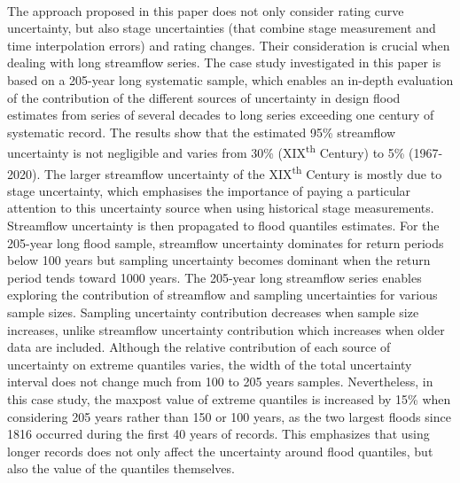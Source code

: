     \paragraph{}
    The approach proposed in this paper does not only consider rating curve uncertainty, but also stage uncertainties (that combine stage measurement and time interpolation errors) and rating changes. Their consideration is crucial when dealing with long streamflow series. The case study investigated in this paper is based on a 205-year long systematic sample, which enables an in-depth evaluation of the contribution of the different sources of uncertainty in design flood estimates from series of several decades to long series exceeding one century of systematic record. The results show that the estimated 95\% streamflow uncertainty is not negligible and varies from 30\% (XIX\textsuperscript{th} Century) to 5\% (1967-2020). The larger streamflow uncertainty of the XIX\textsuperscript{th} Century is mostly due to stage uncertainty, which emphasises the importance of paying a particular attention to this uncertainty source when using historical stage measurements. Streamflow uncertainty is then propagated to flood quantiles estimates. For the 205-year long flood sample, streamflow uncertainty dominates for return periods below 100 years but sampling uncertainty becomes dominant when the return period tends toward 1000 years. The 205-year long streamflow series enables exploring the contribution of streamflow and sampling uncertainties for various sample sizes. Sampling uncertainty contribution decreases when sample size increases, unlike streamflow uncertainty contribution which increases when older data are included. Although the relative contribution of each source of uncertainty on extreme quantiles varies, the width of the total uncertainty interval does not change much from 100 to 205 years samples. Nevertheless, in this case study, the maxpost value of extreme quantiles is increased by 15\% when considering 205 years rather than 150 or 100 years, as the two largest floods since 1816 occurred during the first 40 years of records. This emphasizes that using longer records does not only affect the uncertainty around flood quantiles, but also the value of the quantiles themselves. 


